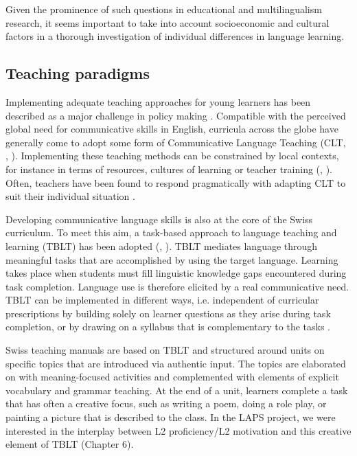 \documentclass[output=paper]{langscibook}
\begin{document}
Given the prominence of such questions in educational and multilingualism research, it seems important to take into account socioeconomic and cultural factors in a thorough investigation of individual differences in language learning.

\subsection{Teaching paradigms} %

Implementing adequate teaching approaches for young learners has been described as a major challenge in policy making \citep{GartonEtAl2011}. Compatible with the perceived global need for communicative skills in English, curricula across the globe have generally come to adopt some form of Communicative Language Teaching (CLT, \citealt{Krashen1981}, \citealt{GartonEtAl2011}). Implementing these teaching methods can be constrained by local contexts, for instance in terms of resources, cultures of learning or teacher training (\citealt{Littlewood2006}, \citealt{Baker2008}). Often, teachers have been found to respond pragmatically with adapting CLT to suit their individual situation \citep{Carless2003}.

Developing communicative language skills is also at the core of the Swiss curriculum. To meet this aim, a task-based approach to language teaching and learning (TBLT) has been adopted (\citealt{Willis1996}, \citealt{Ellis2017}). TBLT mediates language through meaningful tasks that are accomplished by using the target language. Learning takes place when students must fill linguistic knowledge gaps encountered during task completion. Language use is therefore elicited by a real communicative need. TBLT can be implemented in different ways, i.e. independent of curricular prescriptions by building solely on learner questions as they arise during task completion, or by drawing on a syllabus that is complementary to the tasks \citep{Ellis2017}. 

Swiss teaching manuals are based on TBLT and structured around units on specific topics that are introduced via authentic input. The topics are elaborated on with meaning-focused activities and complemented with elements of explicit vocabulary and grammar teaching. At the end of a unit, learners complete a task that has often a creative focus, such as writing a poem, doing a role play, or painting a picture that is described to the class. In the LAPS project, we were interested in the interplay between L2 proficiency/L2 motivation and this creative element of TBLT (Chapter 6).
\end{document}
